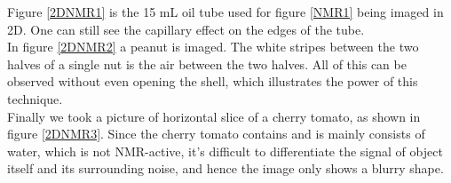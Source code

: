 Figure \ref{2DNMR1} is the 15 mL oil tube used for figure \ref{NMR1} being imaged in 2D. One can still see the capillary effect on the edges of the tube. \\
In figure \ref{2DNMR2} a peanut is imaged. The white stripes between the two halves of a single nut is the air between the two halves. All of this can be observed without even opening the shell, which illustrates the power of this technique. \\
Finally we took a picture of horizontal slice of a cherry tomato, as shown in figure \ref{2DNMR3}. Since the cherry tomato contains and is mainly consists of water, which is not NMR-active, it's difficult to differentiate the signal of object itself and its surrounding noise, and hence the image only shows a blurry shape.\\
